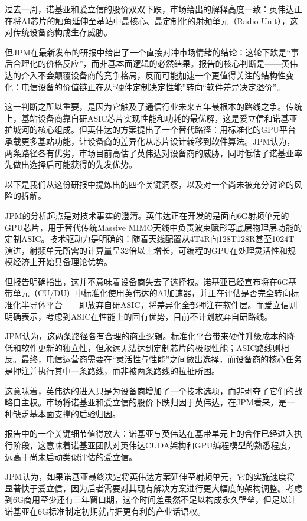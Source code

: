 \documentclass[11pt]{ctexart}
\begin{document}
过去一周，诺基亚和爱立信的股价双双下跌，市场给出的解释高度一致：英伟达正在将AI芯片的触角延伸至基站中最核心、最定制化的射频单元（Radio Unit），这对传统设备商构成生存威胁。

但JPM在最新发布的研报中给出了一个直接对冲市场情绪的结论：这轮下跌是“事后合理化的价格反应”，而非基本面逻辑的必然结果。报告的核心判断是——英伟达的介入不会颠覆设备商的竞争格局，反而可能加速一个更值得关注的结构性变化：电信设备的价值链正在从“硬件定制决定性能”转向“软件差异决定溢价”。

这一判断之所以重要，是因为它触及了通信行业未来五年最根本的路线之争。传统上，基站设备商靠自研ASIC芯片实现性能和功耗的最优解，这是爱立信和诺基亚护城河的核心组成。但英伟达的方案提出了一个替代路径：用标准化的GPU平台承载更多基站功能，让设备商的差异化从芯片设计转移到软件算法。JPM认为，两条路径各有优劣，市场目前高估了英伟达对设备商的威胁，同时低估了诺基亚率先做出选择后可能获得的先发优势。

以下是我们从这份研报中提炼出的四个关键洞察，以及对一个尚未被充分讨论的风险的拆解。

JPM的分析起点是对技术事实的澄清。英伟达正在开发的是面向6G射频单元的GPU芯片，用于替代传统Massive MIMO天线中负责波束赋形等底层物理层功能的定制ASIC。技术驱动力是明确的：随着天线配置从4T4R向128T128R甚至1024T演进，射频单元所需的计算量呈32倍以上增长，可编程的GPU在处理灵活性和规模经济上开始具备理论优势。

但报告明确指出，这并不意味着设备商失去了选择权。诺基亚已经宣布将在6G基带单元（CU/DU）中标准化使用英伟达的AI加速器，并正在评估是否完全转向标准化半导体平台——即放弃自研ASIC，将差异化全部押注在软件层。而爱立信则明确表示，考虑到ASIC在性能上的固有优势，目前不计划放弃自研路线。

JPM认为，这两条路径各有合理的商业逻辑。标准化平台带来硬件升级成本的降低和软件更新的独立性，但永远无法达到定制芯片的极限性能；ASIC路线则相反。最终，电信运营商需要在“灵活性与性能”之间做出选择，而设备商的核心任务是押注并执行其中一条路线，而非被两条路线的拉扯所困。

这意味着，英伟达的进入只是为设备商增加了一个技术选项，而非剥夺了它们的战略自主权。市场将诺基亚和爱立信的股价下跌归因于英伟达，在JPM看来，是一种缺乏基本面支撑的后验归因。

报告中的一个关键细节值得放大：诺基亚与英伟达在基带单元上的合作已经进入执行阶段，这意味着诺基亚团队对英伟达CUDA架构和GPU编程模型的熟悉程度，远高于尚未启动类似评估的爱立信。

JPM认为，如果诺基亚最终决定将英伟达方案延伸至射频单元，它的实施速度将显著快于爱立信，因为后者需要对其现有解决方案进行更大幅度的架构调整。考虑到6G商用至少还有三年窗口期，这个时间差虽然不足以构成永久壁垒，但足以让诺基亚在6G标准制定初期就占据更有利的产业话语权。
\end{document}
